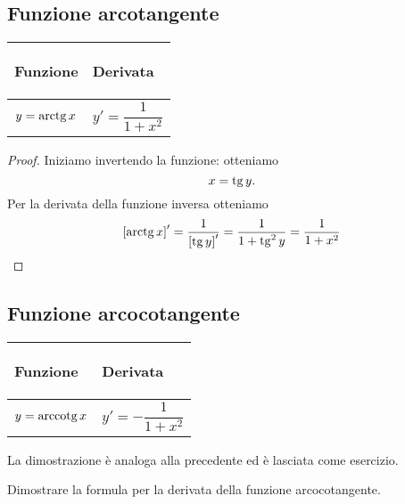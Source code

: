 \subsection{Funzione arcotangente}
\begin{center}
    \begin{tabular}{m{}|m{}}
        \begin{center}
            \textbf{Funzione}
        \end{center}
        & 
        \begin{center}
            \textbf{Derivata}
        \end{center}\\
        \hline
            \[y=\operatorname{arctg} x\] &
            \[y'=\frac{1}{1+x^2}\]
    \end{tabular}
\end{center}
    \begin{proof}
        Iniziamo invertendo la funzione: otteniamo 
        \[x=\operatorname{tg} y.\]
        Per la derivata della funzione inversa otteniamo
        \[\left[ \operatorname{arctg} x \right]'=\frac{1}{\left[ \operatorname{tg} y \right]'}=\frac{1}{1+\operatorname{tg}^2 y}=\frac{1}{1+x^2}\]
    \end{proof}
\subsection{Funzione arcocotangente}
\begin{center}
    \begin{tabular}{m{}|m{}}
        \begin{center}
            \textbf{Funzione}
        \end{center}
        & 
        \begin{center}
            \textbf{Derivata}
        \end{center}\\
        \hline
            \[y=\operatorname{arccotg} x\] &
            \[y'=-\frac{1}{1+x^2}\]
    \end{tabular}
\end{center}
La dimostrazione è analoga alla precedente ed è lasciata come esercizio.
\begin{exc}\label{exc: derivata arccotg}
    Dimostrare la formula per la derivata della funzione arcocotangente. 
\end{exc}

